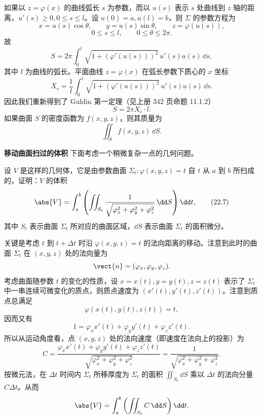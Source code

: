 \begin{xremark}
如果以 $z=\varphi(x)$ 的曲线弧长 $s$ 为参数，而以 $u(s)$ 表示 $s$ 处曲线到 $z$ 轴的距离，$u'(s)\ge0,0\le s\le l$。设 $u(0)=a,u(l)=b$，则 $\Sigma$ 的参数方程为
\[
  x=u(s)\cos\theta,\qquad y=u(s)\sin\theta,\qquad z=\varphi(u(s)),
\]
\[
  0\le s\le l,\qquad0\le\theta\le2\pi.
\]
故
\[
  S=2\pi\int_0^l\sqrt{1+(\varphi'(u(s)))^2}\,u'(s)u(s)\,\dd s,
\]
其中 $l$ 为曲线的弧长。平面曲线 $z=\varphi(x)$ 在弧长参数下质心的 $x$ 坐标
\[
  X_c=\frac1l\int_0^l\sqrt{1+(\varphi'(u(s)))^2}\,u'(s)u(s)\,\dd s.
\]
因此我们重新得到了 Guldin 第一定理（见上册 342 页命题 11.1.2）
\[
  S=2\pi X_c\cdot l.
\]
如果曲面 $S$ 的密度函数为 $f(x,y,z)$，则其质量为
\[
  \iint_S f(x,y,z)\,\dd S.
\]
\end{xremark}

\textbf{移动曲面扫过的体积}
下面考虑一个稍微复杂一点的几何问题。

\begin{xexample}[22.5.3]
设 $V$ 是这样的几何体，它是由参数曲面 $\Sigma_t\colon\varphi(x,y,z)=t$ 自 $t$ 从 $a$ 到 $b$ 所扫成的，证明：$V$ 的体积
\begin{equation}
  \abs{V}=\int_a^b\left(\iint_{S_t}\frac1{\sqrt{\varphi_x^2+\varphi_y^2+\varphi_z^2}}\,\dd S\right)\dd t,
  \tag{22.7}
  \label{eq:22.7}
\end{equation}
其中 $S_t$ 表示曲面 $\Sigma_t$ 所对应的曲面区域，$\dd S$ 表示曲面 $\Sigma_t$ 的面积微分。
\end{xexample}
\begin{xproof}
关键是考虑 $t$ 到 $t+\Delta t$ 时沿 $\varphi(x,y,z)=t$ 的法向距离的移动。注意到此时的曲面 $\Sigma_t$ 在 $(x,y,z)$ 处的法向量为
\[
  \vect{n}=(\varphi_x,\varphi_y,\varphi_z).
\]
考虑曲面随参数 $t$ 的变化的性质，设 $x=x(t),y=y(t),z=z(t)$ 表示了 $\Sigma_t$ 中一串连续可微变化的质点，则质点速度为 $(x'(t),y'(t),z'(t))$。注意到质点总满足
\[
  \varphi(x(t),y(t),z(t))=t,
\]
因而又有
\[
  1=\varphi_xx'(t)+\varphi_yy'(t)+\varphi_zz'(t).
\]
所以从运动角度看，点 $(x,y,z)$ 处的法向速度（即速度在法向上的投影）为
\[
  C=\frac{\varphi_xx'(t)+\varphi_yy'(t)+\varphi_zz'(t)}{\sqrt{\varphi_x^2+\varphi_y^2+\varphi_z^2}}
  =\frac1{\sqrt{\varphi_x^2+\varphi_y^2+\varphi_z^2}}.
\]
按微元法，在 $\Delta t$ 时间内 $\Sigma_t$ 所移厚度为 $\Sigma_t$ 的面积 $\iint_{S_t}\dd S$ 乘以 $\Delta t$ 的法向分量 $C\Delta t$。从而
\[
  \abs{V}=\int_a^b\left(\iint_{S_t}C\,\dd S\right)\dd t.
\]
\end{xproof}

